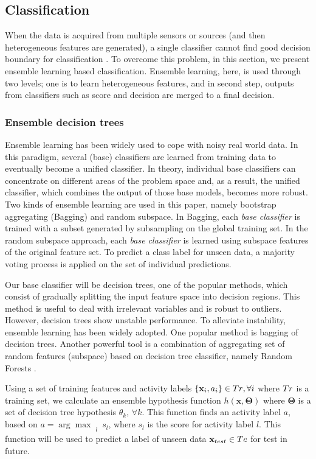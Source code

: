 \documentclass{sig-alternate}
\begin{document}
\subsection{Classification}
 When the data is acquired from multiple sensors or sources (and then heterogeneous features are generated), a single classifier cannot find good decision boundary for classification \cite{Polikar2006Ensemble}. To overcome this problem, in this section, we present ensemble learning based classification. Ensemble learning, here, is used through two levels; one is to learn heterogeneous features, and in second step, outputs from classifiers such as score and decision are merged to a final decision.

\subsubsection{Ensemble decision trees}
Ensemble learning has been widely used to cope with noisy real world data. In this paradigm, several (base) classifiers are learned from training data to eventually become a unified classifier. In theory, individual base classifiers can concentrate on different areas of the problem space and, as a result, the unified classifier, which combines the output of those base models, becomes more robust. Two kinds of ensemble learning are used in this paper, namely bootstrap aggregating (Bagging) and random subspace. In Bagging, each \textit{base classifier} is trained with a subset generated by subsampling on the global training set. In the random subspace approach, each \textit{base classifier} is learned using subspace features of the original feature set. To predict a class label for unseen data, a majority voting process is applied on the set of individual predictions.

 Our base classifier will be decision trees, one of the popular methods, which consist of gradually splitting the input feature space into decision regions. This method is useful to deal with irrelevant variables and is robust to outliers. However, decision trees show unstable performance. To alleviate instability, ensemble learning has been widely adopted. One popular method is bagging of decision trees. Another powerful tool is a combination of aggregating set of random features (subspace) based on decision tree classifier, namely Random Forests  \cite{Ho1998RandomSubspaceForests}.


Using a set of training features and activity labels $\{\mathbf{x}_i, {a}_i \}  \in \mathnormal{Tr}, \forall i$ where  $\mathnormal{Tr}$ is a training set, we calculate an ensemble hypothesis function $h(\mathbf{x}, \boldsymbol{\Theta} )$ where $\boldsymbol{\Theta}$ is a set of decision tree hypothesis $\theta_k$, $\forall k$. This function finds an activity label ${a}$, based on $a = {\arg \max}_{\substack{l}}~{s_l}$, where $s_l$ is the score for activity label $l$. This function will be used to predict a label of unseen data $\mathbf{x}_{test} \in \mathnormal{Te}$ for test in future.
\end{document}
